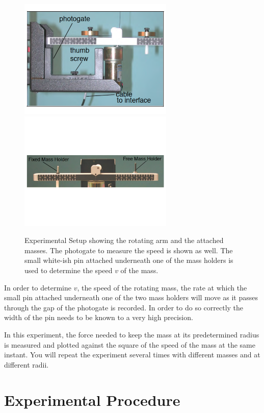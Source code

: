 \begin{figure}
  \begin{center}
    \includegraphics[width=2.9in]{Experiment08Figures/Figure01a.pdf}
    \includegraphics[width=2.9in]{Experiment08Figures/Figure01b.pdf}
  \end{center}
  \caption{Experimental Setup showing the rotating arm and the attached masses. The photogate to measure the speed is shown as well. The small white-ish pin attached underneath one of the mass holders is used to determine the speed $v$ of the mass.}
  \label{M04Fig01}  %
\end{figure}

In order to determine $v$, the speed of the rotating mass, the rate at which the small pin attached underneath one of the two mass holders will move as it passes through the gap of the photogate is recorded. In order to do so correctly the width of the pin needs to be known to a very high precision.

In this experiment, the force needed to keep the mass at its predetermined radius is measured and plotted against the square of the speed of the mass at the same instant. You will repeat the experiment several times with different masses and at different radii.


\section{Experimental Procedure}

